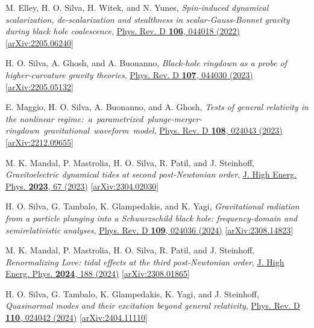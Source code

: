 \documentclass[10pt]{article}
\begin{document}
\begin{bibenum}
    \item M. Elley, H. O. Silva, H. Witek, and N. Yunes,
    \emph{Spin-induced dynamical scalarization, de-scalarization and stealthness in scalar-Gauss-Bonnet gravity during black hole coalescence},
    \href{https://journals.aps.org/prd/abstract/10.1103/PhysRevD.106.044018}{Phys. Rev. D {\bf 106}, 044018 (2022)}
    [\href{https://arxiv.org/abs/2205.06240}{arXiv:2205.06240}]

    \item H. O. Silva, A. Ghosh, and A. Buonanno,
    \emph{Black-hole ringdown as a probe of higher-curvature gravity theories},
    \href{https://journals.aps.org/prd/abstract/10.1103/PhysRevD.107.044030}{Phys. Rev. D {\bf 107}, 044030 (2023)}
    [\href{https://arxiv.org/abs/2212.09655}{arXiv:2205.05132}]

    \item E. Maggio, H. O. Silva, A. Buonanno, and A. Ghosh,
    \emph{Tests of general relativity in the nonlinear regime:~a~parametrized~plunge-merger-ringdown~gravitational~waveform~model},
    \href{https://link.aps.org/doi/10.1103/PhysRevD.108.024043}{Phys. Rev. D {\bf 108}, 024043 (2023)}
    [\href{https://arxiv.org/abs/2212.09655}{arXiv:2212.09655}]

    \item M. K. Mandal, P. Mastrolia, H. O. Silva, R. Patil, and J. Steinhoff,
    \emph{Gravitoelectric dynamical tides at second post-Newtonian order},
    \href{https://link.springer.com/article/10.1007/JHEP11(2023)067}{J. High Energ. Phys. {\bf 2023}, 67 (2023)}
    [\href{https://arxiv.org/abs/2304.02030}{arXiv:2304.02030}]

    \item H. O. Silva, G. Tambalo, K. Glampedakis, and K. Yagi,
    \emph{Gravitational radiation from a particle plunging into a Schwarzschild black hole: frequency-domain and semirelativistic analyses},
    \href{https://journals.aps.org/prd/abstract/10.1103/PhysRevD.109.024036}{Phys. Rev. D {\bf 109}, 024036 (2024)}
    [\href{https://arxiv.org/abs/2308.14823}{arXiv:2308.14823}]

    \item M. K. Mandal, P. Mastrolia, H. O. Silva, R. Patil, and J. Steinhoff,
    \emph{Renormalizing Love: tidal effects at the third post-Newtonian order},
    \href{https://link.springer.com/article/10.1007/JHEP02(2024)188}{J. High Energ. Phys. {\bf 2024}, 188 (2024)}
    [\href{https://arxiv.org/abs/2308.01865}{arXiv:2308.01865}]

    \item H. O. Silva, G. Tambalo, K. Glampedakis, K. Yagi, and J. Steinhoff,
    \emph{Quasinormal modes and their excitation beyond general relativity},
    \href{https://journals.aps.org/prd/abstract/10.1103/PhysRevD.110.024042}{Phys. Rev. D {\bf 110}, 024042 (2024)}
    [\href{https://arxiv.org/abs/2404.11110}{arXiv:2404.11110}]


\end{bibenum}
\end{document}
